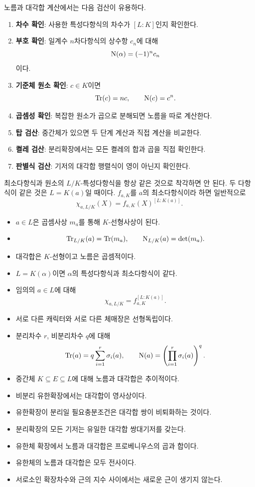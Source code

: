 노름과 대각합 계산에서는 다음 검산이 유용하다.
\begin{enumerate}
  \item \textbf{차수 확인}: 사용한 특성다항식의 차수가 $[L:K]$인지 확인한다.
  \item \textbf{부호 확인}: 일계수 $n$차다항식의 상수항 $c_n$에 대해
  \[
    \operatorname{N}(\alpha)=(-1)^n c_n
  \]
  이다.
  \item \textbf{기준체 원소 확인}: $c\in K$이면
  \[
    \operatorname{Tr}(c)=nc,\qquad\operatorname{N}(c)=c^n.
  \]
  \item \textbf{곱셈성 확인}: 복잡한 원소가 곱으로 분해되면 노름을 따로 계산한다.
  \item \textbf{탑 검산}: 중간체가 있으면 두 단계 계산과 직접 계산을 비교한다.
  \item \textbf{켤레 검산}: 분리확장에서는 모든 켤레의 합과 곱을 직접 확인한다.
  \item \textbf{판별식 검산}: 기저의 대각합 행렬식이 영이 아닌지 확인한다.
\end{enumerate}

\begin{pitfall}
최소다항식과 원소의 $L/K$-특성다항식을 항상 같은 것으로 착각하면 안 된다.
두 다항식이 같은 것은 $L=K(a)$일 때이다. $f_{a,K}$를 $a$의 최소다항식이라 하면 일반적으로
\[
  \chi_{a,L/K}(X)
  =f_{a,K}(X)^{[L:K(a)]}.
\]
\end{pitfall}

\begin{chapterreview}
\begin{itemize}
  \item $a\in L$은 곱셈사상 $m_a$를 통해 $K$-선형사상이 된다.
  \item
  \[
    \operatorname{Tr}_{L/K}(a)=\operatorname{Tr}(m_a),
    \qquad
    \operatorname{N}_{L/K}(a)=\det(m_a).
  \]
  \item 대각합은 $K$-선형이고 노름은 곱셈적이다.
  \item $L=K(\alpha)$이면 $\alpha$의 특성다항식과 최소다항식이 같다.
  \item 임의의 $a\in L$에 대해
  \[
    \chi_{a,L/K}
    =f_{a,K}^{[L:K(a)]}.
  \]
  \item 서로 다른 캐릭터와 서로 다른 체매장은 선형독립이다.
  \item 분리차수 $r$, 비분리차수 $q$에 대해
  \[
    \operatorname{Tr}(a)=q\sum_{i=1}^r\sigma_i(a),
    \qquad
    \operatorname{N}(a)=\left(\prod_{i=1}^r\sigma_i(a)\right)^q.
  \]
  \item 중간체 $K\subseteq E\subseteq L$에 대해 노름과 대각합은 추이적이다.
  \item 비분리 유한확장에서는 대각합이 영사상이다.
  \item 유한확장이 분리일 필요충분조건은 대각합 쌍이 비퇴화하는 것이다.
  \item 분리확장의 모든 기저는 유일한 대각합 쌍대기저를 갖는다.
  \item 유한체 확장에서 노름과 대각합은 프로베니우스의 곱과 합이다.
  \item 유한체의 노름과 대각합은 모두 전사이다.
  \item 서로소인 확장차수와 근의 지수 사이에서는 새로운 근이 생기지 않는다.
\end{itemize}
\end{chapterreview}

